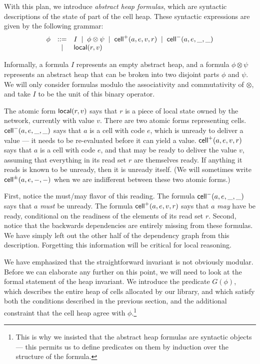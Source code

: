 \documentclass[preprint,natbib]{sigplanconf}
\begin{document}
With this plan, we introduce \emph{abstract heap formulas}, which are
syntactic descriptions of the state of part of the cell heap. These
syntactic expressions are given by the following grammar:
\begin{displaymath}
  \begin{array}{lcl}
    \phi & ::= & I \;\;|\;\; \phi \otimes \psi \;\;|\;\; \mbox{\textsf{{cell}}}^{+}({a}, {e}, {v}, {r}) \;\;|\;\; \mbox{\textsf{{cell}}}^{-}({a}, {e}, {\_}, {\_})\\
         &  |  & \mbox{\textsf{{local}}}({r}, {v}) 
  \end{array}
\end{displaymath}

Informally, a formula $I$ represents an empty abstract heap, and a
formula $\phi \otimes \psi$ represents an abstract heap that can be
broken into two disjoint parts $\phi$ and $\psi$. We will only
consider formulas modulo the associativity and commutativity of
$\otimes$, and take $I$ to be the unit of this binary operator.

The atomic form $\mbox{\textsf{{local}}}({r}, {v})$ says that $r$ is a piece of local
state owned by the network, currently with value $v$. There are two
atomic forms representing cells. $\mbox{\textsf{{cell}}}^{-}({a}, {e}, {\_}, {\_})$ says that $a$ is a
cell with code $e$, which is unready to deliver a value --- it needs
to be re-evaluated before it can yield a value. $\mbox{\textsf{{cell}}}^{+}({a}, {e}, {v}, {r})$
says that $a$ is a cell with code $e$, and that may be ready to deliver
the value $v$, assuming that everything in its read set $r$ are themselves
ready. If anything it reads is known to be unready, then it is unready
itself. (We will sometimes write $\mbox{\textsf{{cell}}}^{\pm}({a}, {e}, {-}, {-})$ when we are indifferent
between these two atomic forms.) 

First, notice the must/may flavor of this reading. The formula
$\mbox{\textsf{{cell}}}^{-}({a}, {e}, {\_}, {\_})$ says that $a$ \emph{must} be unready.  The formula
$\mbox{\textsf{{cell}}}^{+}({a}, {e}, {v}, {r})$ says that $a$ \emph{may} have be ready,
conditional on the readiness of the elements of its read set
$r$. Second, notice that the backwards dependencies are entirely
missing from these formulas. We have simply left out the other half of
the dependency graph from this description. Forgetting this
information will be critical for local reasoning.

We have emphasized that the straightforward invariant is not obviously
modular. Before we can elaborate any further on this point, we will
need to look at the formal statement of the heap invariant. We
introduce the predicate $G(\phi)$, which describes the entire heap of
cells allocated by our library, and which satisfy both the conditions
described in the previous section, and the additional constraint that
the cell heap agree with $\phi$.\footnote{This is why we insisted that
  the abstract heap formulas are syntactic objects --- this permits us
  to define predicates on them by induction over the structure of the
formula.}
\end{document}
